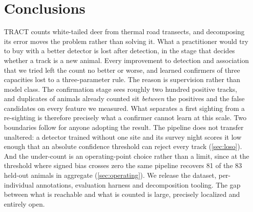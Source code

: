 \section{Conclusions}
\label{sec:conclusion}

TRACT counts white-tailed deer from thermal road transects, and decomposing its error moves
the problem rather than solving it. What a practitioner would try to buy with a better
detector is lost after detection, in the stage that decides whether a track is a new
animal. Every improvement to detection and association that we tried left the count no
better or worse, and learned confirmers of three capacities lost to a three-parameter rule.
The reason is supervision rather than model class. The confirmation stage sees roughly two
hundred positive tracks, and duplicates of animals already counted sit \emph{between} the
positives and the false candidates on every feature we measured. What separates a first
sighting from a re-sighting is therefore precisely what a confirmer cannot learn at this
scale. Two boundaries follow for anyone adopting the result. The pipeline does not transfer
unaltered: a detector trained without one site and its survey night scores it low enough
that an absolute confidence threshold can reject every track (\cref{sec:loso}). And the
under-count is an operating-point choice rather than a limit, since at the threshold where
signed bias crosses zero the same pipeline recovers 81 of the 83 held-out animals in
aggregate (\cref{sec:operating}). We release the dataset, per-individual annotations,
evaluation harness and decomposition tooling. The gap between what is reachable and what is
counted is large, precisely localized and entirely open.

